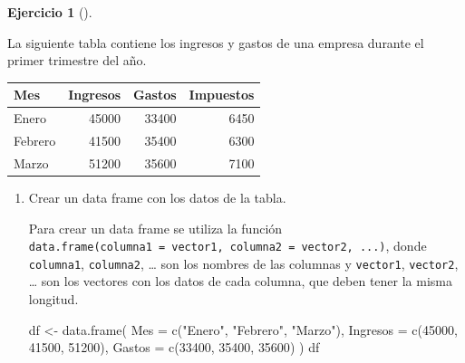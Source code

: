 \documentclass[
  a4paper,
]{scrreport}
\newenvironment{Shaded}{\begin{snugshade}}{\end{snugshade}}
\newcommand{\AttributeTok}[1]{\textcolor[rgb]{0.40,0.45,0.13}{#1}}
\newcommand{\DecValTok}[1]{\textcolor[rgb]{0.68,0.00,0.00}{#1}}
\newcommand{\FunctionTok}[1]{\textcolor[rgb]{0.28,0.35,0.67}{#1}}
\newcommand{\NormalTok}[1]{\textcolor[rgb]{0.00,0.23,0.31}{#1}}
\newcommand{\OtherTok}[1]{\textcolor[rgb]{0.00,0.23,0.31}{#1}}
\newcommand{\StringTok}[1]{\textcolor[rgb]{0.13,0.47,0.30}{#1}}
\theoremstyle{definition}
\newtheorem{exercise}{Ejercicio}[chapter]
\theoremstyle{remark}
\begin{document}
\begin{exercise}[]\protect\hypertarget{exr-dataframes-1}{}\label{exr-dataframes-1}

La siguiente tabla contiene los ingresos y gastos de una empresa durante
el primer trimestre del año.

\begin{longtable}[]{@{}lrrr@{}}
\toprule\noalign{}
Mes & Ingresos & Gastos & Impuestos \\
\midrule\noalign{}
\endhead
\bottomrule\noalign{}
\endlastfoot
Enero & 45000 & 33400 & 6450 \\
Febrero & 41500 & 35400 & 6300 \\
Marzo & 51200 & 35600 & 7100 \\
\end{longtable}

\begin{enumerate}
\def\labelenumi{\alph{enumi}.}
\item
  Crear un data frame con los datos de la tabla.

  \begin{tcolorbox}[enhanced jigsaw, colframe=quarto-callout-tip-color-frame, toprule=.15mm, bottomtitle=1mm, breakable, opacitybacktitle=0.6, toptitle=1mm, colback=white, bottomrule=.15mm, title=\textcolor{quarto-callout-tip-color}{\faLightbulb}\hspace{0.5em}{Solución}, arc=.35mm, left=2mm, titlerule=0mm, rightrule=.15mm, coltitle=black, leftrule=.75mm, opacityback=0, colbacktitle=quarto-callout-tip-color!10!white]

  Para crear un data frame se utiliza la función
  \texttt{data.frame(columna1\ =\ vector1,\ columna2\ =\ vector2,\ ...)},
  donde \texttt{columna1}, \texttt{columna2}, \ldots{} son los nombres
  de las columnas y \texttt{vector1}, \texttt{vector2}, \ldots{} son los
  vectores con los datos de cada columna, que deben tener la misma
  longitud.

\begin{Shaded}
\begin{Highlighting}[]
\NormalTok{df }\OtherTok{\textless{}{-}} \FunctionTok{data.frame}\NormalTok{(}
    \AttributeTok{Mes =} \FunctionTok{c}\NormalTok{(}\StringTok{"Enero"}\NormalTok{, }\StringTok{"Febrero"}\NormalTok{, }\StringTok{"Marzo"}\NormalTok{),}
    \AttributeTok{Ingresos =} \FunctionTok{c}\NormalTok{(}\DecValTok{45000}\NormalTok{, }\DecValTok{41500}\NormalTok{, }\DecValTok{51200}\NormalTok{),}
    \AttributeTok{Gastos =} \FunctionTok{c}\NormalTok{(}\DecValTok{33400}\NormalTok{, }\DecValTok{35400}\NormalTok{, }\DecValTok{35600}\NormalTok{)}
\NormalTok{    )}
\NormalTok{df }
\end{Highlighting}
\end{Shaded}


\end{tcolorbox}
\end{enumerate}
\end{exercise}
\end{document}
